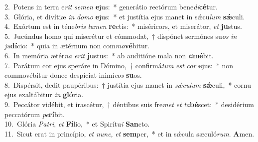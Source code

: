 {2.~}Potens in terra e\textit{rit} \textit{se}\textit{men} \textbf{e}jus:~* generátio rectórum bene\textit{di}\textbf{cé}tur.\\
{3.~}Glória, et divítiæ \textit{in} \textit{do}\textit{mo} \textbf{e}jus:~* et justítia ejus manet in sǽcu\textit{lum} \textbf{sǽ}culi.\\
{4.~}Exórtum est in téne\textit{bris} \textit{lu}\textit{men} \textbf{re}ctis:~* miséricors, et miserátor, \textit{et} \textbf{ju}stus.\\
{5.~}Jucúndus homo qui miserétur et cómmodat,~† dispónet sermónes su\textit{os} \textit{in} \textit{ju}\textbf{dí}cio:~* quia in ætérnum non com\textit{mo}\textbf{vé}bitur.\\
{6.~}In memória ætér\textit{na} \textit{e}\textit{rit} \textbf{ju}stus:~* ab auditióne mala non \textit{ti}\textbf{mé}bit.\\
{7.~}Parátum cor ejus speráre in Dómino,~† confirmá\textit{tum} \textit{est} \textit{cor} \textbf{e}jus:~* non commovébitur donec despíciat inimí\textit{cos} \textbf{su}os.\\
{8.~}Dispérsit, dedit paupéribus:~† justítia ejus manet in \textit{sǽ}\textit{cu}\textit{lum} \textbf{sǽ}culi,~* cornu ejus exaltábitur \textit{in} \textbf{gló}ria.\\
{9.~}Peccátor vidébit, et irascétur,~† déntibus suis fre\textit{met} \textit{et} \textit{ta}\textbf{bé}scet:~* desidérium peccatórum \textit{pe}\textbf{rí}bit.\\
{10.~}Glória \textit{Pa}\textit{tri}, \textit{et} \textbf{Fí}lio,~* et Spirítu\textit{i} \textbf{San}cto.\\
{11.~}Sicut erat in princípio, \textit{et} \textit{nunc}, \textit{et} \textbf{sem}per,~* et in sǽcula sæculó\textit{rum}. \textbf{A}men.\\
